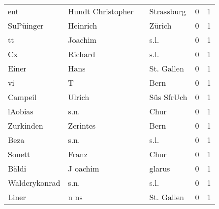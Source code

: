 \begin{tabular}{llllrr}
                      ent &                  Hundt Christopher &             &                                  Strassburg &          0 &         1 \\
                SuPüinger &                           Heinrich &             &                                      Zürich &          0 &         1 \\
                       tt &                            Joachim &             &                                        s.l. &          0 &         1 \\
                       Cx &                            Richard &             &                                        s.l. &          0 &         1 \\
                    Einer &                               Hans &             &                                  St. Gallen &          0 &         1 \\
                       vi &                                  T &             &                                        Bern &          0 &         1 \\
                  Campeil &                             Ulrich &             &                                  Süs SfrUch &          0 &         1 \\
                  lAobias &                               s.n. &             &                                        Chur &          0 &         1 \\
                Zurkinden &                           Zerintes &             &                                        Bern &          0 &         1 \\
                     Beza &                               s.n. &             &                                        s.l. &          0 &         1 \\
                   Sonett &                              Franz &             &                                        Chur &          0 &         1 \\
                    Bäldi &                           J oachim &             &                                      glarus &          0 &         1 \\
            Walderykonrad &                               s.n. &             &                                        s.l. &          0 &         1 \\
                    Liner &                               n ns &             &                                  St. Gallen &          0 &         1 \\

\end{tabular}
